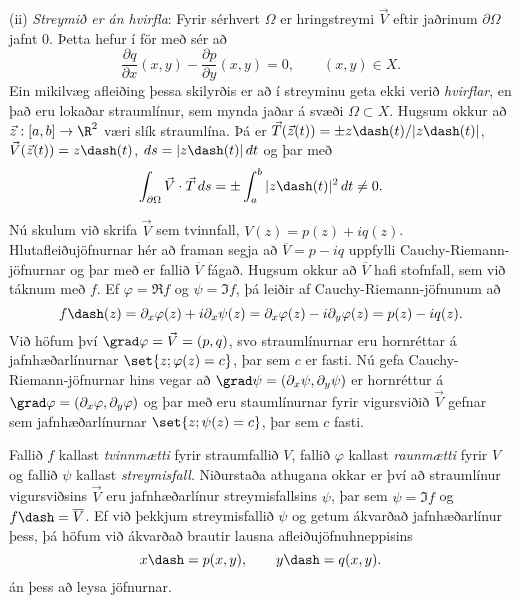 \smallskip\noindent
(ii) {\it Streymið er án hvirfla}:  Fyrir sérhvert ${\Omega}$ er
hringstreymi $\vec V$ eftir jaðrinum ${\partial}{\Omega}$ jafnt $0$.  
Þetta  hefur í för með sér að 
\begin{equation*}
\dfrac{\partial q}{\partial x}(x,y)-
\dfrac{\partial p}{\partial y}(x,y)=0, \qquad (x,y)\in X.
\label{4.7.6}
\end{equation*}
Ein mikilvæg afleiðing þessa skilyrðis er að í streyminu geta ekki verið
{\it hvirflar}, en það eru lokaðar straumlínur, sem
mynda jaðar á svæði ${\Omega}\subset X$.  Hugsum okkur að
$\vec z:[a,b]\to \R^2$ væri slík straumlína. Þá er
$\vec T(\vec z(t))=\pm z\dash(t)/|z\dash(t)|$, 
$\vec V(\vec z(t))= z\dash(t)$, $ds=|z\dash(t)|\, dt$ og þar með
$$
\int_{{\partial}{\Omega}} \vec V\cdot \vec T\, ds =
\pm\int_a^b |z\dash(t)|^2\, dt \neq 0.
$$

\smallskip 
Nú skulum við skrifa $\vec V$ sem tvinnfall,
$V(z)=p(z)+iq(z)$.  Hlutafleiðujöfnurnar hér að framan
segja að $\overline  V=p-iq$
uppfylli Cauchy-Riemann-jöfnurnar og þar með er
fallið  $\overline V$ fágað.  Hugsum okkur að $\overline V$
hafi stofnfall, sem við táknum með $f$. 
Ef ${\varphi}=\Re f$ og
${\psi}=\Im f$, þá leiðir af Cauchy-Riemann-jöfnunum að 
 $$
f\dash(z)=\partial_x\varphi(z)+i\partial_x\psi(z)
=\partial_x\varphi(z)-i\partial_y\varphi(z)
=p(z)-iq(z).
 $$
Við höfum því $\grad\varphi=\vec V=(p,q)$, svo straumlínurnar eru
hornréttar á jafnhæðarlínurnar
$\set{z; \varphi(z)=c}$, þar sem $c$ er fasti.  Nú gefa
Cauchy-Riemann-jöfnurnar hins vegar að $\grad \psi=(\partial_x\psi,
\partial_y\psi)$ er hornréttur á $\grad\varphi=(\partial_x\varphi,
\partial_y\varphi)$ og þar með eru staumlínurnar fyrir vigursviðið
$\vec V$ gefnar sem jafnhæðarlínurnar $\set{z; \psi(z)=c}$, þar sem
$c$ fasti.

Fallið $f$ kallast {\it tvinnmætti} fyrir straumfallið $V$, fallið
$\varphi$ kallast {\it raunmætti} fyrir  $V$ og fallið $\psi$
kallast {\it streymisfall}.  Niðurstaða athugana okkar er því að
straumlínur vigursviðsins $\vec V$ eru jafnhæðarlínur
streymisfallsins $\psi$, þar sem $\psi= \Im f$ og $f\dash = \overline
V$.  Ef við þekkjum streymisfallið ${\psi}$ og getum ákvarðað
jafnhæðarlínur þess, þá höfum við ákvarðað brautir lausna
afleiðujöfnuhneppisins 
\begin{equation*}
x\dash=p(x,y), \qquad y\dash=q(x,y).
\end{equation*}
án þess að leysa jöfnurnar.

